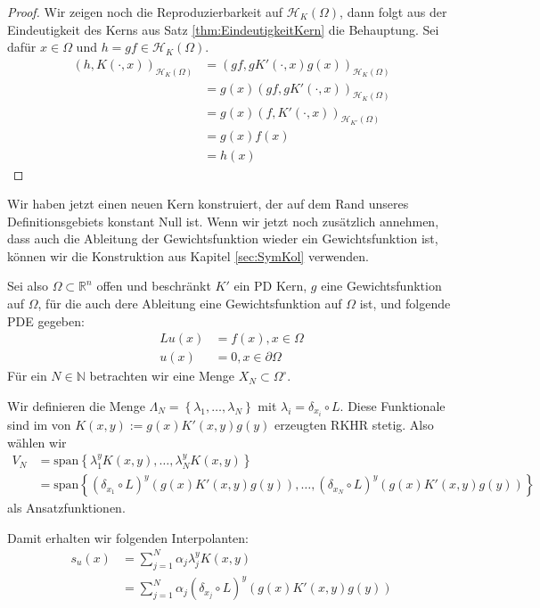 \begin{proof}
Wir zeigen noch die Reproduzierbarkeit auf $\mathcal{H}_K(\Omega)$, dann folgt aus der Eindeutigkeit des Kerns aus Satz \ref{thm:EindeutigkeitKern} die Behauptung. Sei dafür $x \in \Omega$ und $h = gf \in \mathcal{H}_K (\Omega)$.
\begin{align*}
\left(h, K(\cdot,x) \right)_{\mathcal{H}_K(\Omega)} &= \left(gf, gK'(\cdot, x) g(x)\right)_{\mathcal{H}_K(\Omega)}\\
&= g(x) \left( gf, gK'(\cdot, x)\right)_{\mathcal{H}_K(\Omega)}\\
&= g(x) \left( f, K'(\cdot, x)\right)_{\mathcal{H}_{K'}(\Omega)}\\
&= g(x) f(x)\\
&= h(x)
\end{align*}
\end{proof}

Wir haben jetzt einen neuen Kern konstruiert, der auf dem Rand unseres Definitionsgebiets konstant Null ist. Wenn wir jetzt noch zusätzlich annehmen, dass auch die Ableitung der Gewichtsfunktion wieder ein Gewichtsfunktion ist, können wir die Konstruktion aus Kapitel \ref{sec:SymKol} verwenden. 

Sei also $\Omega \subset \mathbb{R}^n$ offen und beschränkt $K'$ ein \ac{PD} Kern, $g$ eine Gewichtsfunktion auf $\Omega$, für die auch dere Ableitung eine Gewichtsfunktion auf $\Omega$ ist, und folgende \ac{PDE} gegeben:
\begin{align*}
Lu(x) &= f(x), x \in \Omega\\
u(x) &= 0 , x \in \partial \Omega
\end{align*}
Für ein $N \in \mathbb{N}$ betrachten wir eine Menge $X_N \subset \Omega^\circ$.

Wir definieren die Menge $\Lambda_N = \left\{ \lambda_1, \dots, \lambda_N\right\}$ mit $\lambda_i =  \delta_{x_i} \circ L$. Diese Funktionale sind im von $K(x,y) := g(x) K'(x,y) g(y)$ erzeugten \ac{RKHR} stetig. Also wählen wir 
\begin{align*}
V_N &= \text{span} \left\{\lambda_1^y K(x,y), \dots, \lambda_N^y K(x,y)\right\}\\
&= \text{span} \left\{(\delta_{x_1} \circ L)^y (g(x) K'(x,y) g(y)), \dots, (\delta_{x_N} \circ L)^y (g(x) K'(x,y) g(y))\right\}
\end{align*}
als Ansatzfunktionen.

Damit erhalten wir folgenden Interpolanten:
\begin{align*}
s_u(x) &= \sum_{j=1}^N \alpha_j \lambda_j^y K(x,y)\\
&= \sum_{j=1}^N \alpha_j (\delta_{x_j} \circ L)^y( g(x)K'(x,y)g(y))
\end{align*}

